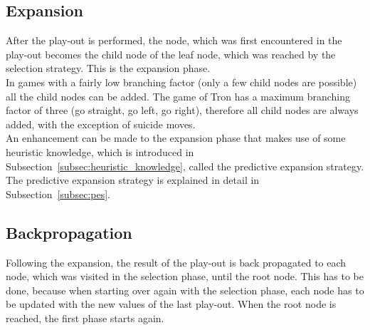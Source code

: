 \subsection{Expansion}
\label{subsec:expansion}
After the play-out is performed, the node, which was first encountered in the play-out becomes the child node of the leaf node, which was reached by the selection strategy. This is the expansion phase.\\
In games with a fairly low branching factor (only a few child nodes are possible) all the child nodes can be added. The game of Tron has a maximum branching factor of three (go straight, go left, go right), therefore all child nodes are always added, with the exception of suicide moves.\\
An enhancement can be made to the expansion phase that makes use of some heuristic knowledge, which is introduced in Subsection~\ref{subsec:heuristic_knowledge}, called the predictive expansion strategy. The predictive expansion strategy is explained in detail in Subsection~\ref{subsec:pes}.

\subsection{Backpropagation}
\label{subsec:backpropagation}
Following the expansion, the result of the play-out is back propagated to each node, which was visited in the selection phase, until the root node. This has to be done, because when starting over again with the selection phase, each node has to be updated with the new values of the last play-out. When the root node is reached, the first phase starts again.
